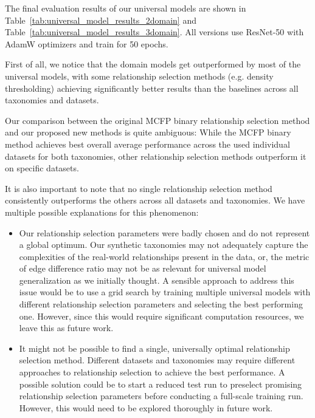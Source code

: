 The final evaluation results of our universal models are shown in Table~\ref{tab:universal_model_results_2domain}
and Table~\ref{tab:universal_model_results_3domain}.
All versions use ResNet-50 with AdamW optimizers and train for 50 epochs.

First of all, we notice that the domain models get outperformed by most of the universal models,
with some relationship selection methods (e.g. density thresholding) achieving significantly
better results than the baselines across all taxonomies and datasets.

Our comparison between the original MCFP binary relationship selection method
and our proposed new methods is quite ambiguous:
While the MCFP binary method achieves best overall average performance across the
used individual datasets for both taxonomies,
other relationship selection methods outperform it on specific datasets.

It is also important to note that no single relationship selection method consistently outperforms the others across all datasets and taxonomies.
We have multiple possible explanations for this phenomenon:
\begin{itemize}
      \item Our relationship selection parameters were badly chosen and do not represent a global optimum.
            Our synthetic taxonomies may not adequately capture the complexities of the real-world relationships present in the data,
            or, the metric of edge difference ratio may not be as relevant for universal model generalization as we initially thought.
            A sensible approach to address this issue would be to use a grid search by training multiple universal models
            with different relationship selection parameters and selecting the best performing one.
            However, since this would require significant computation resources, we leave this as future work.
      \item It might not be possible to find a single, universally optimal relationship selection method.
            Different datasets and taxonomies may require different approaches to relationship selection
            to achieve the best performance.
            A possible solution could be to start a reduced test run to preselect promising relationship selection parameters
            before conducting a full-scale training run.
            However, this would need to be explored thoroughly in future work.
\end{itemize}

